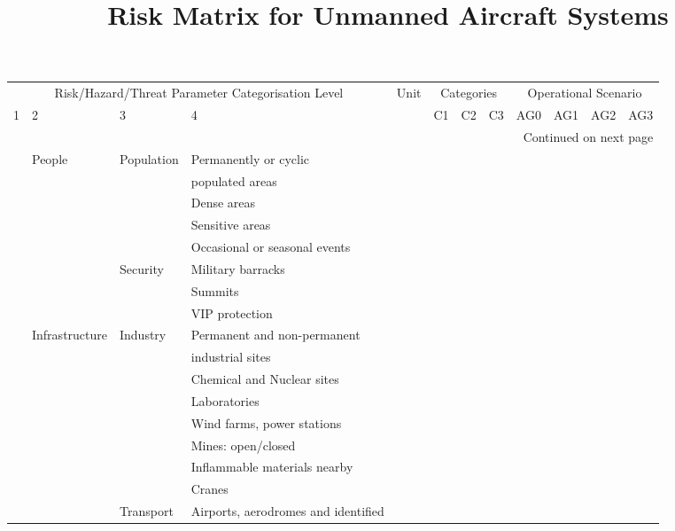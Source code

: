 \documentclass{report}
\begin{document}
\title{Risk Matrix for Unmanned Aircraft Systems}

\begin{centering}
\small
  \ttfamily
\begin{longtable}{|l|l|l|l|c|c|c|c|c|c|c|c|}
 \hline
  \multicolumn{4}{|c|}{Risk/Hazard/Threat Parameter Categorisation Level}  & Unit & \multicolumn{3}{|c|}{Categories} & \multicolumn{4}{|c|}{Operational Scenario} \\\cline{1-4}\cline{6-12}
  1 & 2 & 3 & 4 & & C1 & C2 & C3 & {AG0} & {AG1} & {AG2} & {AG3} \\
 \hline
  \endhead
  \hline \multicolumn{12}{|r|}{{Continued on next page}} \\ \hline
  \endfoot
  \hline
  \endlastfoot

  \multirow{21}{3em}{Ground} & \multirow{8}{7em}{People}  & \multirow{4}{5em}{Population} & Permanently or cyclic & & & & & & & & \\
  & & & populated areas & & & & & & & & \\\cline{4-4}
  & & & Dense areas & & & & & & & & \\\cline{4-4}
  & & & Sensitive areas & & & & & & & & \\\cline{4-4}
  & & & Occasional or seasonal events & & & & & & & & \\\cline{3-4}
  & & \multirow{3}{5em}{Security} & Military barracks & & & & & & & & \\
  & & & Summits & & & & & & & & \\
  & & & VIP protection & & & & & & & & \\\cline{2-4}
  & \multirow{12}{5em}{Infrastructure} & \multirow{5}{3em}{Industry} & Permanent and non-permanent & & & & & & & & \\
  & & & industrial sites & & & & & & & & \\\cline{4-4}
  & & & Chemical and Nuclear sites & & & & & & & & \\\cline{4-4}
  & & & Laboratories & & & & & & & & \\\cline{4-4}
  & & & Wind farms, power stations & & & & & & & & \\\cline{4-4}
  & & & Mines: open/closed & & & & & & & & \\\cline{4-4}
  & & & Inflammable materials nearby & & & & & & & & \\\cline{4-4}
  & & & Cranes & & & & & & & & \\\cline{3-4}
  & & \multirow{6}{5em}{Transport} & Airports, aerodromes and identified & & & & & & & & \\

\end{longtable}
\end{centering}
\end{document}
